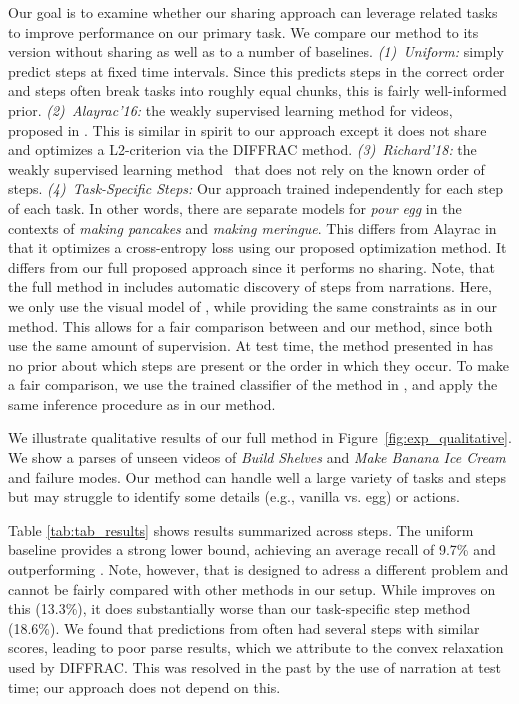 \documentclass[10pt,twocolumn,letterpaper]{article}
\begin{document}
 Our goal is to examine whether our
sharing approach can leverage related tasks to improve performance on our
primary task. We compare our method to its version without sharing as well as to a number of baselines.
{\it (1)~Uniform:} simply predict steps at fixed time intervals. Since this predicts steps in the correct order and steps often break tasks into roughly equal chunks, this is fairly well-informed prior.
{\it (2)~Alayrac'16:} the weakly supervised learning method for videos, proposed in \cite{Alayrac15Unsupervised}. This
is similar in spirit to our approach except it does not share and optimizes a
L2-criterion via the DIFFRAC \cite{Bach07diffrac} method.
{\it (3)~Richard'18:} the weakly supervised learning method~\cite{richard18actionsets} that does not rely on the known order of steps.
{\it (4)~Task-Specific Steps:}
Our approach trained independently for each step of each task. In other words,
there are separate models for {\it pour egg} in the contexts of {\it making pancakes}
and {\it making meringue}. This differs from Alayrac in that it optimizes a cross-entropy loss using our proposed
optimization method. It differs from our full proposed approach since it
performs no sharing.
Note, that the full method in \cite{Alayrac15Unsupervised} includes automatic discovery of steps from narrations. Here, we only use the visual model of \cite{Alayrac15Unsupervised}, while providing the same constraints as in our method. This allows for a fair comparison between \cite{Alayrac15Unsupervised} and our method, since both use the same amount of supervision.
At test time, the method presented in \cite{richard18actionsets} has no prior about which steps are present or the order in which they occur. To make a fair comparison, we use the trained classifier of the method in \cite{richard18actionsets}, and apply the same inference procedure as in our method.

 We illustrate qualitative results of our full method
in Figure~\ref{fig:exp_qualitative}. We show a parses of unseen videos of {\it Build Shelves} and
{\it Make Banana Ice Cream} and failure modes.
Our method can handle well a large variety of tasks and steps
but may struggle to identify some details (e.g., vanilla vs. egg) or actions.

Table \ref{tab:tab_results} shows results summarized across steps.
The uniform baseline provides a strong lower bound, achieving an average recall of 9.7\% and outperforming \cite{richard18actionsets}. Note, however, that \cite{richard18actionsets} is designed to adress a different problem and cannot be fairly compared with other methods in our setup.
While \cite{Alayrac15Unsupervised} improves on this (13.3\%), it does substantially worse than our task-specific step method (18.6\%).
We found that predictions from \cite{Alayrac15Unsupervised} often had several steps with similar scores, leading to poor parse results, which we attribute to the convex relaxation used by DIFFRAC.
This was resolved in the past by the use of narration at test time; our approach does not depend on this.
\end{document}
